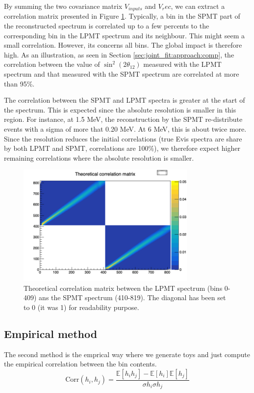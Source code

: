 \documentclass[../main.tex]{subfiles}
\begin{document}
By summing the two covariance matrix $V_{inputs}$ and $V_rec$, we can extract a correlation matrix presented in Figure \ref{fig:joint_fit:th_cor_mat}.
Typically, a bin in the SPMT part of the reconstructed spectrum is correlated up to a few percents to the corresponding bin in the LPMT spectrum and its neighbour. This might seem a small correlation. However, its concerns all bins. The global impact is therefore high. As an illustration, as seen in Section \ref{sec:joint_fit:approach:comp}, the correlation between the value of $\sin^2(2 \theta_{12})$ measured with the LPMT spectrum and that measured with the SPMT spectrum are correlated at more than 95\%.

The correlation between the SPMT and LPMT spectra is greater at the start of the spectrum. This is expected since the absolute resolution is smaller in this region. For instance, at 1.5 MeV,  the reconstruction by the SPMT re-distribute events with a sigma of more that 0.20 MeV. At 6 MeV, this is about twice more. Since the resolution reduces the initial correlations (true Evis spectra are share by both LPMT and SPMT, correlations are 100\%), we therefore expect higher remaining correlations where the absolute resolution is smaller.

\begin{figure}[ht]
  \centering
  \includegraphics[height=6cm]{images/joint_fit/theoretical_corr.png}
  \caption{Theoretical correlation matrix between the LPMT spectrum (bins 0-409) ans the SPMT spectrum (410-819). The diagonal has been set to 0 (it was 1) for readability purpose.}
  \label{fig:joint_fit:th_cor_mat}
\end{figure}

\subsection{Empirical method}
\label{sec:joint_fit:cov_mat:emp}

The second method is the emprical way where we generate toys and just compute the empirical correlation between the bin contents.
\begin{equation}
  \mathrm{Corr}(h_i, h_j) = \frac{\mathbb{E}[h_i h_j] - \mathbb{E}[h_i] \mathbb{E}[h_j]}{\sigma h_i \sigma h_j}
\end{equation}
\end{document}
